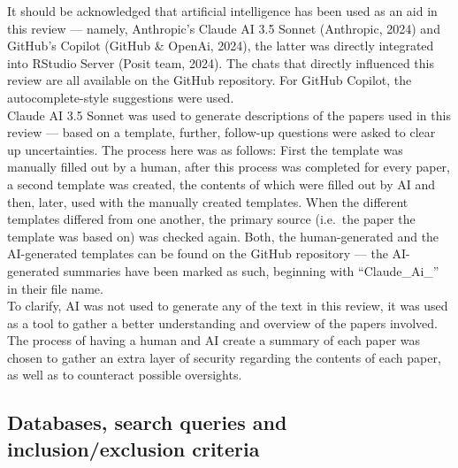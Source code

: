 \documentclass[
  stu, a4paper,floatsintext]{apa7}
\begin{document}
It should be acknowledged that artificial intelligence has been used as an aid in this review --- namely, Anthropic's Claude AI 3.5 Sonnet (Anthropic, 2024) and GitHub's Copilot (GitHub \& OpenAi, 2024), the latter was directly integrated into RStudio Server (Posit team, 2024). The chats that directly influenced this review are all available on the GitHub repository.
For GitHub Copilot, the autocomplete-style suggestions were used.\\
Claude AI 3.5 Sonnet was used to generate descriptions of the papers used in this review --- based on a template, further, follow-up questions were asked to clear up uncertainties.
The process here was as follows: First the template was manually filled out by a human, after this process was completed for every paper, a second template was created, the contents of which were filled out by AI and then, later, used with the manually created templates. When the different templates differed from one another, the primary source (i.e.~the paper the template was based on) was checked again. Both, the human-generated and the AI-generated templates can be found on the GitHub repository --- the AI-generated summaries have been marked as such, beginning with ``Claude\_Ai\_'' in their file name.\\
To clarify, AI was not used to generate any of the text in this review, it was used as a tool to gather a better understanding and overview of the papers involved. The process of having a human and AI create a summary of each paper was chosen to gather an extra layer of security regarding the contents of each paper, as well as to counteract possible oversights.

\subsection{Databases, search queries and inclusion/exclusion criteria}\label{databases-search-queries-and-inclusionexclusion-criteria}
\end{document}
